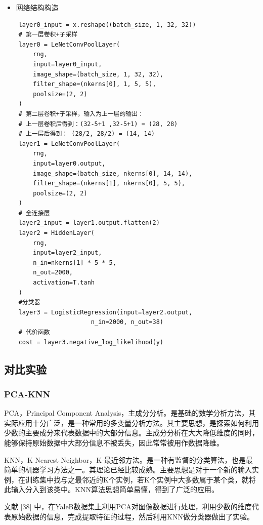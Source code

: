 \documentclass[bachelor,zhspacing]{cqu}  %
\def\tightlist{}
\begin{document}
\begin{itemize}
\tightlist
\item
  网络结构构造
\end{itemize}

\begin{verbatim}
    layer0_input = x.reshape((batch_size, 1, 32, 32))
    # 第一层卷积+子采样
    layer0 = LeNetConvPoolLayer(
        rng,
        input=layer0_input,
        image_shape=(batch_size, 1, 32, 32),
        filter_shape=(nkerns[0], 1, 5, 5),
        poolsize=(2, 2)
    )
    # 第二层卷积+子采样，输入为上一层的输出：
    # 上一层卷积后得到：(32-5+1 ,32-5+1) = (28, 28)
    # 上一层后得到： (28/2, 28/2) = (14, 14)
    layer1 = LeNetConvPoolLayer(
        rng,
        input=layer0.output,
        image_shape=(batch_size, nkerns[0], 14, 14),
        filter_shape=(nkerns[1], nkerns[0], 5, 5),
        poolsize=(2, 2)
    )
    # 全连接层
    layer2_input = layer1.output.flatten(2)
    layer2 = HiddenLayer(
        rng,
        input=layer2_input,
        n_in=nkerns[1] * 5 * 5,
        n_out=2000,
        activation=T.tanh
    )
    #分类器
    layer3 = LogisticRegression(input=layer2.output, 
                        n_in=2000, n_out=38)   
    # 代价函数
    cost = layer3.negative_log_likelihood(y)
\end{verbatim}

\subsection{对比实验}\label{ux5bf9ux6bd4ux5b9eux9a8c}

\subsubsection{PCA-KNN}\label{pca-knn}

PCA，Principal Component
Analysis，主成分分析。是基础的数学分析方法，其实际应用十分广泛，是一种常用的多变量分析方法。其主要思想，是探索如何利用少数的主要成分来代表数据中的大部分信息。主成分分析在大大降低维度的同时，能够保持原始数据中大部分信息不被丢失，因此常常被用作数据降维。

KNN，K Nearest
Neighbor，K-最近邻方法。是一种有监督的分类算法，也是最简单的机器学习方法之一。其理论已经比较成熟。主要思想是对于一个新的输入实例，在训练集中找与之最邻近的K个实例，若K个实例中大多数属于某个类，就将此输入分入到该类中。KNN算法思想简单易懂，得到了广泛的应用。

文献 {[}38{]}
中，在YaleB数据集上利用PCA对图像数据进行处理，利用少数的维度代表原始数据的信息，完成提取特征的过程，然后利用KNN做分类器做出了实验。
\end{document}
